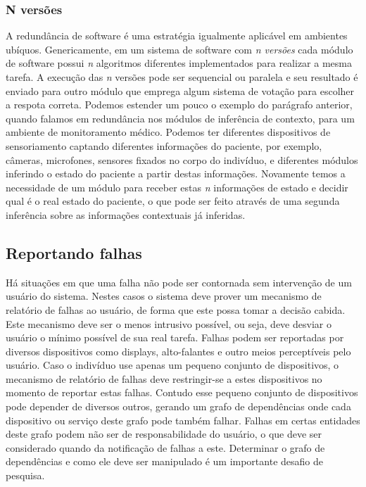 
\subsubsection*{N versões} %

A redundância de software é uma estratégia igualmente aplicável em ambientes ubíquos. Genericamente, em um sistema de software com \emph{n versões} cada módulo de software possui \emph{n} algoritmos diferentes implementados para realizar a mesma tarefa. A execução das \emph{n} versões pode ser sequencial ou paralela e seu resultado é enviado para outro módulo que emprega algum sistema de votação para escolher a respota correta. Podemos estender um pouco o exemplo do parágrafo anterior, quando falamos em redundância nos módulos de inferência de contexto, para um ambiente de monitoramento médico. Podemos ter diferentes dispositivos de sensoriamento captando diferentes informações do paciente, por exemplo, câmeras, microfones, sensores fixados no corpo do indivíduo, e diferentes módulos inferindo o estado do paciente a partir destas informações. Novamente temos a necessidade de um módulo para receber estas \emph{n} informações de estado e decidir qual é o real estado do paciente, o que pode ser feito através de uma segunda inferência sobre as informações contextuais já inferidas.


\subsection{Reportando falhas} %
\label{sub:reportando_falhas}

Há situações em que uma falha não pode ser contornada sem intervenção de um usuário do sistema. Nestes casos o sistema deve prover um mecanismo de relatório de falhas ao usuário, de forma que este possa tomar a decisão cabida. Este mecanismo deve ser o menos intrusivo possível, ou seja, deve desviar o usuário o mínimo possível de sua real tarefa. Falhas podem ser reportadas por diversos dispositivos como displays, alto-falantes e outro meios perceptíveis pelo usuário. Caso o indivíduo use apenas um pequeno conjunto de dispositivos, o mecanismo de relatório de falhas deve restringir-se a estes dispositivos no momento de reportar estas falhas. Contudo esse pequeno conjunto de dispositivos pode depender de diversos outros, gerando um grafo de dependências onde cada dispositivo ou serviço deste grafo pode também falhar. Falhas em certas entidades deste grafo podem não ser de responsabilidade do usuário, o que deve ser considerado quando da notificação de falhas a este. Determinar o grafo de dependências e como ele deve ser manipulado é um importante desafio de pesquisa.


